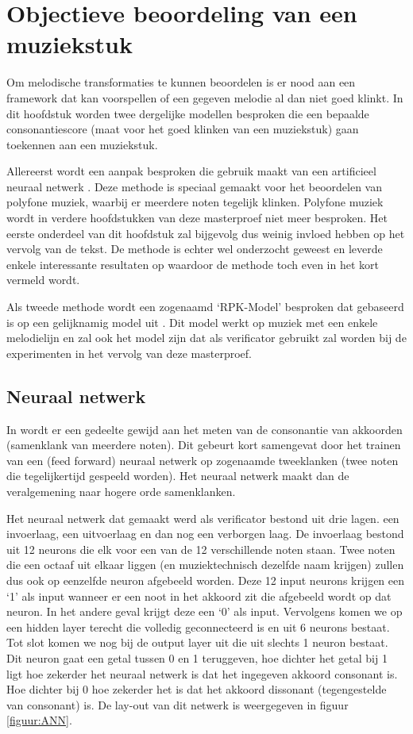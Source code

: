 \chapter{Objectieve beoordeling van een muziekstuk}
\label{hoofdstuk:OBM}
Om melodische transformaties te kunnen beoordelen is er nood aan een framework dat kan voorspellen of een gegeven melodie al dan niet goed klinkt. In dit hoofdstuk worden twee dergelijke modellen besproken die een bepaalde consonantiescore (maat voor het goed klinken van een muziekstuk) gaan toekennen aan een muziekstuk. 

Allereerst wordt een aanpak besproken die gebruik maakt van een artificieel neuraal netwerk \cite{book:ANN}. Deze methode is speciaal gemaakt voor het beoordelen van polyfone muziek, waarbij er meerdere noten tegelijk klinken. Polyfone muziek wordt in verdere hoofdstukken van deze masterproef niet meer besproken. Het eerste onderdeel van dit hoofdstuk zal bijgevolg dus weinig invloed hebben op het vervolg van de tekst. De methode is echter wel onderzocht geweest en leverde enkele interessante resultaten op waardoor de methode toch even in het kort vermeld wordt. 

Als tweede methode wordt een zogenaamd `RPK-Model' besproken dat gebaseerd is op een gelijknamig model uit \cite{book:musicAndProbability}. Dit model werkt op muziek met een enkele melodielijn en zal ook het model zijn dat als verificator gebruikt zal worden bij de experimenten in het vervolg van deze masterproef.

\section{Neuraal netwerk}
\label{OBM:NN}
In \cite{book:musimathics} wordt er een gedeelte gewijd aan het meten van de consonantie van akkoorden (samenklank van meerdere noten). Dit gebeurt kort samengevat door het trainen van een (feed forward) neuraal netwerk\cite{url:FFNN} op zogenaamde tweeklanken (twee noten die tegelijkertijd gespeeld worden). Het neuraal netwerk maakt dan de veralgemening naar hogere orde samenklanken. 

Het neuraal netwerk dat gemaakt werd als verificator bestond uit drie lagen. een invoerlaag, een uitvoerlaag en dan nog een verborgen laag. De invoerlaag bestond uit 12 neurons die elk voor een van de 12 verschillende noten staan. Twee noten die een octaaf uit elkaar liggen (en muziektechnisch dezelfde naam krijgen) zullen dus ook op eenzelfde neuron afgebeeld worden. Deze 12 input neurons krijgen een `1' als input wanneer er een noot in het akkoord zit die afgebeeld wordt op dat neuron. In het andere geval krijgt deze een `0' als input. Vervolgens komen we op een hidden layer terecht die volledig geconnecteerd is en uit 6 neurons bestaat. Tot slot komen we nog bij de output layer uit die uit slechts 1 neuron bestaat. Dit neuron gaat een getal tussen 0 en 1 teruggeven, hoe dichter het getal bij 1 ligt hoe zekerder het neuraal netwerk is dat het ingegeven akkoord consonant is. Hoe dichter bij 0 hoe zekerder het is dat het akkoord dissonant (tegengestelde van consonant) is. De lay-out van dit netwerk is weergegeven in figuur \ref{figuur:ANN}.\\

